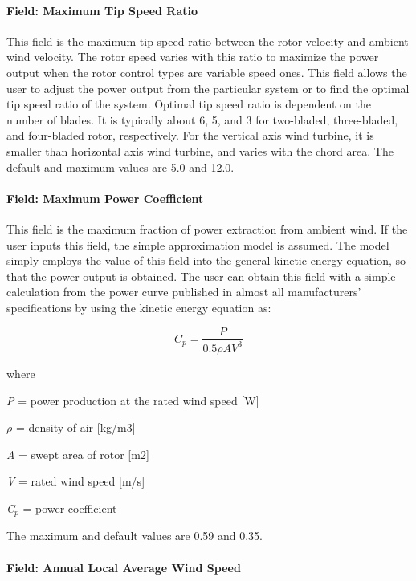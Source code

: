 \paragraph{Field: Maximum Tip Speed Ratio}\label{field-maximum-tip-speed-ratio}

This field is the maximum tip speed ratio between the rotor velocity and ambient wind velocity. The rotor speed varies with this ratio to maximize the power output when the rotor control types are variable speed ones. This field allows the user to adjust the power output from the particular system or to find the optimal tip speed ratio of the system. Optimal tip speed ratio is dependent on the number of blades. It is typically about 6, 5, and 3 for two-bladed, three-bladed, and four-bladed rotor, respectively. For the vertical axis wind turbine, it is smaller than horizontal axis wind turbine, and varies with the chord area. The default and maximum values are 5.0 and 12.0.

\paragraph{Field: Maximum Power Coefficient}\label{field-maximum-power-coefficient}

This field is the maximum fraction of power extraction from ambient wind. If the user inputs this field, the simple approximation model is assumed. The model simply employs the value of this field into the general kinetic energy equation, so that the power output is obtained. The user can obtain this field with a simple calculation from the power curve published in almost all manufacturers' specifications by using the kinetic energy equation as:

\begin{equation}
{C_p} = \frac{P}{{0.5\rho A{V^3}}}
\end{equation}

where

\emph{P} = power production at the rated wind speed {[}W{]}

\(\rho\) = density of air {[}kg/m3{]}

\emph{A} = swept area of rotor {[}m2{]}

\emph{V} = rated wind speed {[}m/s{]}

\emph{C\(_{p}\)} = power coefficient

The maximum and default values are 0.59 and 0.35.

\paragraph{Field: Annual Local Average Wind Speed}\label{field-annual-local-average-wind-speed}

